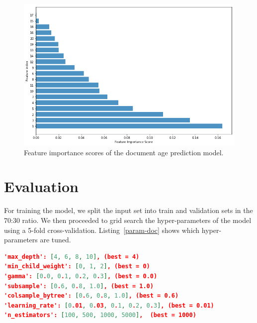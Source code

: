 \begin{figure}
  \centering
  \includegraphics[width=\linewidth]{img/doc_f_importance.png}
  \caption{Feature importance scores of the document age prediction model.}
  \label{fig:fscores}
\end{figure}


\section{Evaluation}
\label{sec:docparams}
For training the model, we split the input set into train and validation sets in the 70:30 ratio. We then proceeded to grid search the hyper-parameters of the model using a 5-fold cross-validation. Listing~\ref{param-doc} shows which hyper-parameters are tuned.

\begin{lstlisting}[language=json,caption=Hyper-parameter tuning for the document age model.,label=param-doc]
'max_depth': [4, 6, 8, 10], (best = 4)
'min_child_weight': [0, 1, 2], (best = 0)
'gamma': [0.0, 0.1, 0.2, 0.3], (best = 0.0)
'subsample': [0.6, 0.8, 1.0], (best = 1.0)
'colsample_bytree': [0.6, 0.8, 1.0], (best = 0.6)
'learning_rate': [0.01, 0.03, 0.1, 0.2, 0.3], (best = 0.01)
'n_estimators': [100, 500, 1000, 5000],  (best = 1000)
\end{lstlisting}


